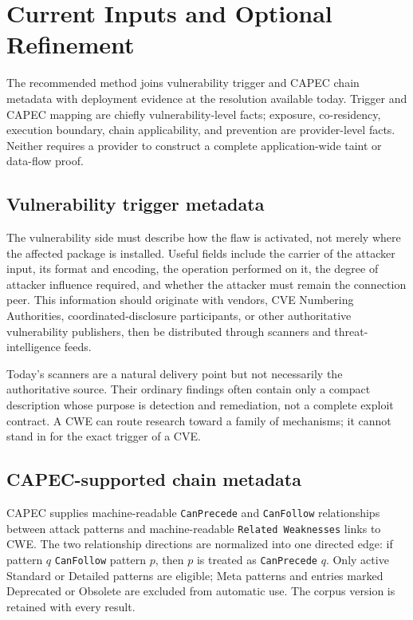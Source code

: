 \documentclass[11pt]{article}
\newcommand{\code}[1]{\texttt{#1}}
\begin{document}
\section{Current Inputs and Optional Refinement}
\label{sec:gaps}
The recommended method joins vulnerability trigger and CAPEC chain metadata
with deployment evidence at the resolution available today. Trigger and CAPEC
mapping are chiefly vulnerability-level facts; exposure, co-residency,
execution boundary, chain applicability, and prevention are provider-level facts.
Neither requires a provider to construct a complete application-wide taint or
data-flow proof.

\subsection{Vulnerability trigger metadata}
The vulnerability side must describe how the flaw is activated, not merely
where the affected package is installed. Useful fields include the carrier of
the attacker input, its format and encoding, the operation performed on it,
the degree of attacker influence required, and whether the attacker must
remain the connection peer. This information should originate with vendors,
CVE Numbering Authorities, coordinated-disclosure participants, or other
authoritative vulnerability publishers, then be distributed through scanners
and threat-intelligence feeds.

Today's scanners are a natural delivery point but not necessarily the
authoritative source. Their ordinary findings often contain only a compact
description whose purpose is detection and remediation, not a complete exploit
contract. A CWE can route research toward a family of mechanisms; it cannot
stand in for the exact trigger of a CVE.

\subsection{CAPEC-supported chain metadata}
CAPEC supplies machine-readable \code{CanPrecede} and \code{CanFollow}
relationships between attack patterns and machine-readable \code{Related
Weaknesses} links to CWE. The two relationship directions are normalized into
one directed edge: if pattern $q$ \code{CanFollow} pattern $p$, then $p$ is
treated as \code{CanPrecede} $q$. Only active Standard or Detailed patterns are
eligible; Meta patterns and entries marked Deprecated or Obsolete are excluded
from automatic use. The corpus version is retained with every result.
\cite{capec-schema,capec-catalog}
\end{document}
